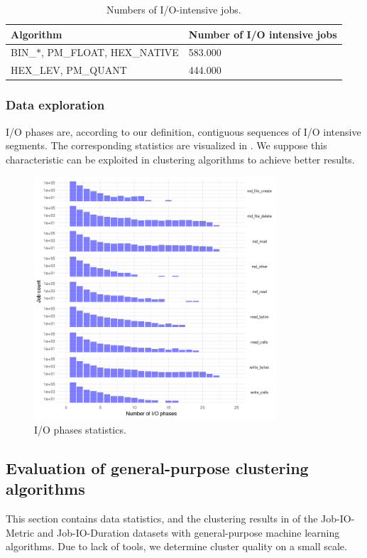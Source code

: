 \documentclass[]{llncs}
\begin{document}
\begin{table}
  \centering
  \begin{tabular}{ll}
    \hline
    Algorithm & Number of I/O intensive jobs \\
    \hline
    BIN\_$\ast$, PM\_FLOAT, HEX\_NATIVE &  583.000 \\
    \hline
    HEX\_LEV, PM\_QUANT &  444.000 \\
    \hline
  \end{tabular}
  \caption{Numbers of I/O-intensive jobs.}
  \label{tab:n_intensive_jobs}
\end{table}

\subsubsection{Data exploration}
I/O phases are, according to our definition, contiguous sequences of I/O intensive segments.
The corresponding statistics are visualized in .
We suppose this characteristic can be exploited in clustering algorithms to achieve better results.

\begin{figure}
  \centering
  \includegraphics[width=3.55in,height=3.56in]{./media/image23.png}
  \caption{I/O phases statistics.}
  \label{fig:phases_stats}
\end{figure}

\subsection{Evaluation of general-purpose clustering algorithms}
This section contains data statistics, and the clustering results in  of the Job-IO-Metric and Job-IO-Duration datasets with general-purpose machine learning algorithms.
Due to lack of tools, we determine cluster quality on a small scale.
\end{document}
